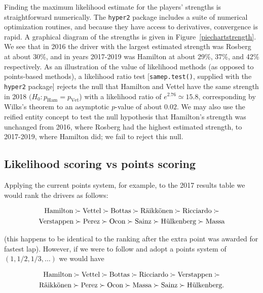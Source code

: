 \documentclass{elsarticle}
\begin{document}
Finding the maximum likelihood estimate for the players' strengths is
straightforward numerically. The \texttt{hyper2} package includes a
suite of numerical optimization routines, and because they have access
to derivatives, convergence is rapid.  A graphical diagram of the
strengths is given in Figure~\ref{piechartstrength}.  We see that in
2016 the driver with the largest estimated strength was Rosberg at
about 30\%, and in years 2017-2019 was Hamilton at about 29\%, 37\%,
and 42\% respectively. As an illustration of the value of likelihood
methods (as opposed to points-based methods), a likelihood ratio test
[\texttt{samep.test()}, supplied with the \texttt{hyper2} package]
rejects the null that Hamilton and Vettel have the same strength in
2018 $(H_0\colon p_\mathrm{Ham}= p_\mathrm{Vet}$) with a likelihood
ratio of $e^{2.76}\simeq 15.8$, corresponding by Wilks's theorem to an
asymptotic \(p\)-value of about \(0.02\). We may also use the reified
entity concept to test the null hypothesis that Hamilton's strength
was unchanged from 2016, where Rosberg had the highest estimated
strength, to 2017-2019, where Hamilton did; we fail to reject this
null.

\subsection{Likelihood scoring vs points
scoring}\label{likelihood-scoring-vs-points-scoring}

Applying the current points system, for example, to the 2017 results
table we would rank the drivers as follows:

\begin{multline}\nonumber
\mbox{Hamilton}\succ
\mbox{Vettel}\succ
\mbox{Bottas}\succ
\mbox{R\"{a}ikk\"{o}nen}\succ
\mbox{Ricciardo}\succ\\
\mbox{Verstappen}\succ
\mbox{Perez}\succ
\mbox{Ocon}\succ
\mbox{Sainz}\succ
\mbox{H\"{u}lkenberg}\succ
\mbox{Massa}
\end{multline}

\noindent (this happens to be identical to the ranking after the extra
point was awarded for fastest lap).  However, if we were to follow
\citet{zipf1949} and adopt a points system of $(1,1/2,1/3,\ldots)$ we
would have

\begin{multline}\nonumber
\mbox{Hamilton}\succ
\mbox{Vettel}\succ
\mbox{Bottas}\succ
\mbox{Ricciardo}\succ
\mbox{Verstappen}\succ\\
\mbox{R\"{a}ikk\"{o}nen}\succ
\mbox{Perez}\succ
\mbox{Ocon}\succ
\mbox{Massa}\succ
\mbox{Sainz}\succ
\mbox{H\"{u}lkenberg}.
\end{multline}
\end{document}
